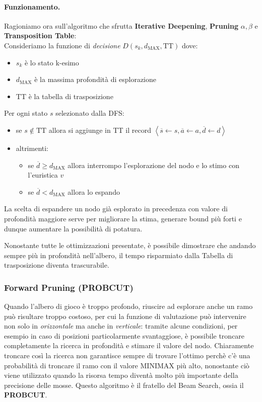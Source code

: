 \paragraph{Funzionamento.} Ragioniamo ora sull'algoritmo che sfrutta \textbf{Iterative Deepening},\textbf{ Pruning }$\alpha,\beta$ e \textbf{Transposition Table}:\\
Consideriamo la funzione di \textit{decisione} $D(s_k, d_\text{MAX}, \text{TT})$ dove:
\begin{itemize}
    \item $s_k$ è lo stato k-esimo
    \item $d_\text{MAX}$ è la massima profondità di esplorazione
    \item TT è la tabella di trasposizione
\end{itemize}
Per ogni stato $s$ selezionato dalla DFS:
\begin{itemize}
    \item se $s \notin \mbox{TT}$ allora si aggiunge in TT il record $\left< \overline{s} \leftarrow s, \overline{a} \leftarrow a, \overline{d} \leftarrow d \right>$
    \item altrimenti:
        \begin{itemize}
            \item se $\overline{d} \geq d_\text{MAX}$ allora interrompo l'esplorazione del nodo e lo stimo con l'euristica $v$
            \item se $\overline{d} < d_\text{MAX}$ allora lo espando
        \end{itemize}
\end{itemize}
La scelta di espandere un nodo già esplorato in precedenza con valore di profondità maggiore serve per migliorare la stima,
 generare bound più forti e dunque aumentare la possibilità di potatura.

Nonostante tutte le ottimizzazioni presentate, è possibile dimostrare che andando sempre più in profondità nell'albero, il tempo
risparmiato dalla Tabella di trasposizione diventa trascurabile.

\subsubsection{Forward Pruning (PROBCUT)}
Quando l'albero di gioco è troppo profondo, riuscire ad esplorare anche un ramo può risultare troppo costoso, per cui la funzione di 
valutazione può intervenire non solo in \textit{orizzontale} ma anche in \textit{verticale}: tramite alcune condizioni, per esempio
in caso di posizioni particolarmente svantaggiose, è possibile troncare completamente la ricerca in profondità e stimare il valore del nodo.
Chiaramente troncare così la ricerca non garantisce sempre di trovare l'ottimo perchè c'è una probabilità di troncare il ramo
con il valore MINIMAX più alto, nonostante ciò viene utilizzato quando la risorsa tempo diventà molto più importante della precisione
delle mosse. Questo algoritmo è il fratello del Beam Search, ossia il \textbf{PROBCUT}.

\newpage

